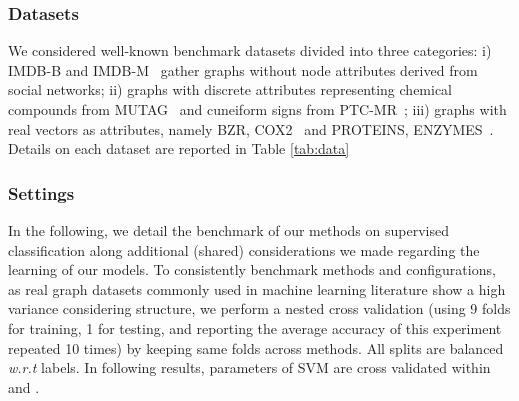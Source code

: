 \documentclass{article}
\begin{document}
	\subsubsection{Datasets}
	\vspace{-4mm}
	\begin{table}[!h]
		\centering
		\caption{Datasets descriptions}
		\label{tab:data}
	\end{table}
	We considered well-known benchmark datasets divided into three categories: i) IMDB-B and IMDB-M~\citep{yanardag-deep-2015} gather graphs without node attributes derived from social networks; ii) graphs with discrete attributes representing chemical compounds from MUTAG~\citep{debnath1991structure} and cuneiform signs from PTC-MR~\citep{krichene2015efficient}; iii) graphs with real vectors as attributes, namely  BZR, COX2~\citep{sutherland2003spline}
	and PROTEINS, ENZYMES~\citep{borgwardt2005shortest}. Details on each dataset are reported in Table \ref{tab:data}
	\subsubsection{Settings}
	In the following, we detail the benchmark of our methods on supervised classification along additional (shared) considerations we made regarding the learning of our models.
	To consistently benchmark methods and configurations, as real graph datasets commonly used in machine learning literature show a high variance considering structure, we perform a nested cross validation (using 9 folds for training, 1 for testing, and reporting the average accuracy of this experiment repeated 10 times) by keeping same folds across methods. All splits are balanced \emph{w.r.t} labels. In following results, parameters of SVM are cross validated within  and .
	
\end{document}
